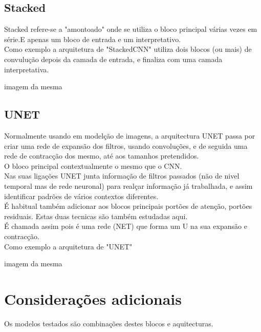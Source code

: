 \subsection{Stacked\label{se:stacked}}

Stacked refere-se a "amontoado" onde se utiliza o bloco principal várias vezes em série.E apenas um bloco de  entrada e um interpretativo. \\
Como exemplo a arquitetura de "StackedCNN" utiliza dois blocos (ou mais) de convulução depois da camada de entrada, e finaliza com uma camada interpretativa.

imagem da mesma



\subsection{UNET\label{se:UNET}}

Normalmente usando em modelção de imagens, a arquitectura UNET passa por criar uma rede de expansão dos filtros, usando convoluções, e de seguida uma rede de contracção dos mesmo, até aos tamanhos pretendidos.\\
O bloco principal contextualmente o mesmo que o CNN.\\
Nas suas ligações UNET junta informação de filtros passados (não de nivel temporal mas de rede neuronal) para realçar informação já trabalhada, e assim identificar padrões de vários contextos diferentes.\\
É habitual também adicionar aos blocos principais portões de atenção, portões residuais. Estas duas tecnicas são também estudadas aqui.\\
É chamada assim pois é uma rede (NET) que forma um U na sua expansão e contracção.\\

Como exemplo a arquitetura de "UNET"

imagem da mesma


\section{Considerações adicionais\label{se:modelos_plus}}

Os modelos testados são combinações destes blocos e aquitecturas. 

